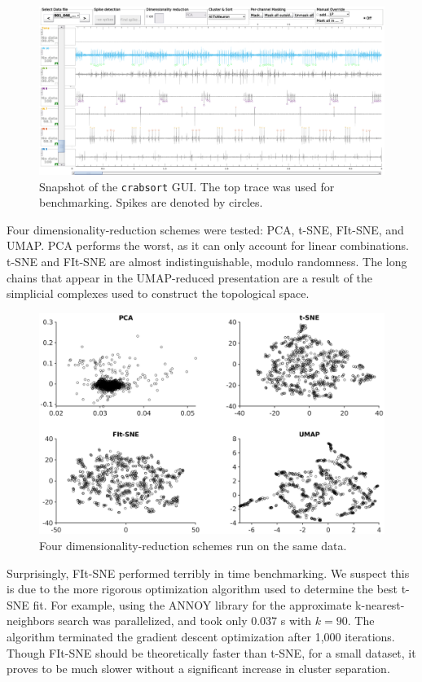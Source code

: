 \documentclass{article}
\begin{document}
\begin{figure}
  \centering
  \includegraphics[width=\textwidth]{gfx/crabsort.eps}
  \caption{Snapshot of the \texttt{crabsort} GUI. The top trace was used for benchmarking. Spikes are denoted by circles.}
  \label{fig:crabsort}
\end{figure}

Four dimensionality-reduction schemes were tested: PCA, t-SNE, FIt-SNE, and UMAP.
PCA performs the worst, as it can only account for linear combinations.
t-SNE and FIt-SNE are almost indistinguishable, modulo randomness.
The long chains that appear in the UMAP-reduced presentation are a result of
the simplicial complexes used to construct the topological space.

\begin{figure}
  \centering
  \includegraphics[width=\textwidth]{gfx/dim-red.eps}
  \caption{Four dimensionality-reduction schemes run on the same data.}
  \label{fig:dim-red-comparison}
\end{figure}

Surprisingly, FIt-SNE performed terribly in time benchmarking.
We suspect this is due to the more rigorous optimization algorithm used
to determine the best t-SNE fit.
For example, using the ANNOY library for the approximate k-nearest-neighbors
search was parallelized, and took only 0.037 s with $k=90$.
The algorithm terminated the gradient descent optimization after 1,000 iterations.
Though FIt-SNE should be theoretically faster than t-SNE, for a small dataset,
it proves to be much slower without a significant increase in cluster separation.
\end{document}
